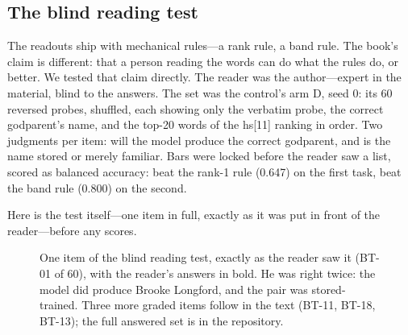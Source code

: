 \documentclass[11pt]{article}
\begin{document}
\subsection{The blind reading test}

The readouts ship with mechanical rules---a rank rule, a band rule. The book's claim is different: that a person reading the words can do what the rules do, or better. We tested that claim directly. The reader was the author---expert in the material, blind to the answers. The set was the control's arm D, seed 0: its 60 reversed probes, shuffled, each showing only the verbatim probe, the correct godparent's name, and the top-20 words of the hs[11] ranking in order. Two judgments per item: will the model produce the correct godparent, and is the name stored or merely familiar. Bars were locked before the reader saw a list, scored as balanced accuracy: beat the rank-1 rule (0.647) on the first task, beat the band rule (0.800) on the second.

Here is the test itself---one item in full, exactly as it was put
in front of the reader---before any scores.

\begin{figure}[h]
\centering
{}
\caption{One item of the blind reading test, exactly as the reader
saw it (BT-01 of 60), with the reader's answers in bold. He was
right twice: the model did produce Brooke Longford, and the pair
was stored-trained. Three more graded items follow in the text
(BT-11, BT-18, BT-13); the full answered set is in the repository.}
\label{fig:blinditem}
\end{figure}
\end{document}
